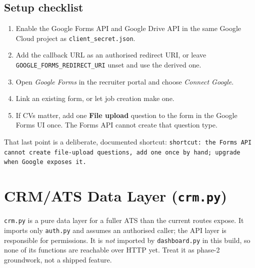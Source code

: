 \documentclass[11pt,a4paper]{article}
\newcommand{\file}[1]{\texttt{\small #1}}
\newcommand{\code}[1]{\texttt{#1}}
\newcommand{\env}[1]{\texttt{\small #1}}
\begin{document}
\subsection{Setup checklist}
\begin{enumerate}[leftmargin=2em]
  \item Enable the Google Forms API and Google Drive API in the same Google
        Cloud project as \file{client\_secret.json}.
  \item Add the callback URL as an authorised redirect URI, or leave
        \env{GOOGLE\_FORMS\_REDIRECT\_URI} unset and use the derived one.
  \item Open \emph{Google Forms} in the recruiter portal and choose
        \emph{Connect Google}.
  \item Link an existing form, or let job creation make one.
  \item If CVs matter, add one \textbf{File upload} question to the form in the
        Google Forms UI once. The Forms API cannot create that question type.
\end{enumerate}

That last point is a deliberate, documented shortcut:
\code{shortcut: the Forms API cannot create file-upload questions, add one once by hand; upgrade when Google exposes it.}

\section{CRM/ATS Data Layer (\file{crm.py})}
\label{u:crm}

\file{crm.py} is a pure data layer for a fuller ATS than the current routes
expose. It imports only \file{auth.py} and assumes an authorised caller; the
API layer is responsible for permissions. It is \emph{not} imported by
\file{dashboard.py} in this build, so none of its functions are reachable over
HTTP yet. Treat it as phase-2 groundwork, not a shipped feature.
\end{document}
